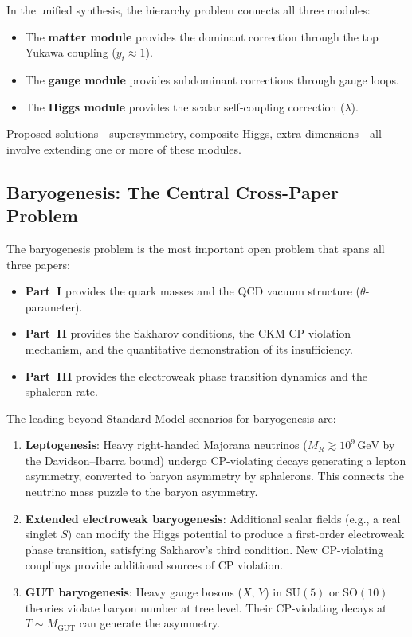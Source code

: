 \documentclass[12pt]{article}
\theoremstyle{definition}
\theoremstyle{remark}
\newcommand{\GeV}{\,\mathrm{GeV}}
\newcommand{\su}[1]{\mathrm{SU}(#1)}
\begin{document}
In the unified synthesis, the hierarchy problem connects all three modules:
\begin{itemize}
\item The \textbf{matter module} provides the dominant correction through the top Yukawa coupling ($y_t \approx 1$).
\item The \textbf{gauge module} provides subdominant corrections through gauge loops.
\item The \textbf{Higgs module} provides the scalar self-coupling correction ($\lambda$).
\end{itemize}

Proposed solutions---supersymmetry, composite Higgs, extra dimensions---all involve extending one or more of these modules.

\subsection{Baryogenesis: The Central Cross-Paper Problem}

The baryogenesis problem is the most important open problem that spans all three papers:

\begin{itemize}
\item \textbf{Part~I} provides the quark masses and the QCD vacuum structure ($\theta$-parameter).
\item \textbf{Part~II} provides the Sakharov conditions, the CKM CP violation mechanism, and the quantitative demonstration of its insufficiency.
\item \textbf{Part~III} provides the electroweak phase transition dynamics and the sphaleron rate.
\end{itemize}

The leading beyond-Standard-Model scenarios for baryogenesis are:

\begin{enumerate}
\item \textbf{Leptogenesis}: Heavy right-handed Majorana neutrinos ($M_R \gtrsim 10^9\GeV$ by the Davidson--Ibarra bound) undergo CP-violating decays generating a lepton asymmetry, converted to baryon asymmetry by sphalerons. This connects the neutrino mass puzzle to the baryon asymmetry.

\item \textbf{Extended electroweak baryogenesis}: Additional scalar fields (e.g., a real singlet $S$) can modify the Higgs potential to produce a first-order electroweak phase transition, satisfying Sakharov's third condition. New CP-violating couplings provide additional sources of CP violation.

\item \textbf{GUT baryogenesis}: Heavy gauge bosons ($X$, $Y$) in $\su{5}$ or $\mathrm{SO}(10)$ theories violate baryon number at tree level. Their CP-violating decays at $T \sim M_{\mathrm{GUT}}$ can generate the asymmetry.
\end{enumerate}
\end{document}
